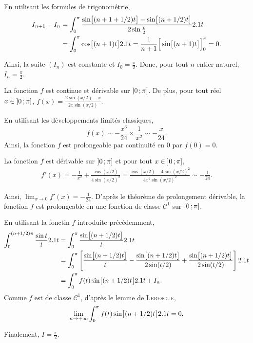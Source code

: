 \begin{solution}
\begin{reponses}
\item En utilisant les formules de trigonométrie,
\begin{align*}
I_{n+1} - I_n
&= \int_0^\pi \frac{\sin\mathopen{}\big[(n + 1 + 1/2)t\big] - \sin\mathopen{}\big[(n + 1/2) t\big]}{2 \sin \frac{t}{2}} 2.1 t\\
&= \int_0^\pi \cos\mathopen{}\big[(n + 1) t\big] 2.1 t
= \frac{1}{n + 1} \Big[\sin\mathopen{}\big[(n + 1) t\big]\Big]_{0}^\pi
= 0.
\end{align*}

Ainsi, la suite $(I_n)$ est constante et $I_0 = \frac{\pi}{2}$. Donc, pour tout $n$ entier naturel, $I_n = \frac{\pi}{2}$.

\item La fonction $f$ est continue et dérivable sur $\left]0\,;\pi\right]$. De plus, pour tout réel $x \in \left]0\,;\pi\right]$, $f(x) = \frac{2 \sin(x/2) - x}{2 x \sin(x/2)}$.

En utilisant les développements limités classiques,
\[
f(x)
\sim -\frac{x^3}{24} \times \frac{1}{x^2}
\sim -\frac{x}{24}.
\]
Ainsi, la fonction $f$ est prolongeable par continuité en $0$ par $f(0) = 0$.

\medskip

La fonction $f$ est dérivable sur $\left]0\,;\pi\right]$ et pour tout $x \in \left]0\,;\pi\right]$,
\begin{align*}
f'(x) = -\frac{1}{x^2} + \frac{\cos(x/2)}{4 \sin(x/2)^2} = \frac{\cos(x/2) - 4 \sin(x/2)^2}{4 x^2 \sin(x/2)^2} \sim -\frac{1}{24}.
\end{align*}

Ainsi, $\lim_{x\to0} f'(x) = -\frac{1}{24}$. D'après le théorème de prolongement dérivable, la fonction $f$ est prolongeable en une fonction de classe $\mathscr{C}^1$ sur $\left[0\,;\pi\right]$.

\item En utilisant la fonctin $f$ introduite précédemment,
\begin{align*}
\int_0^{(n + 1/2) \pi} \frac{\sin t}{t} 2.1 t
&= \int_0^\pi \frac{\sin\mathopen{}\big[(n + 1/2) t\big]}{t} 2.1 t\\
&= \int_0^\pi \left[ \frac{\sin\mathopen{}\big[(n + 1/2) t\big]}{t} - \frac{\sin\mathopen{}\big[(n + 1/2) t\big]}{2 \sin (t/2)} + \frac{\sin\mathopen{}\big[(n + 1/2) t\big]}{2 \sin(t/2)} \right] 2.1 t\\
&= \int_0^\pi f(t) \sin\mathopen{}\big[(n + 1/2) t\big] 2.1 t + I_n.
\end{align*}
Comme $f$ est de classe $\mathscr{C}^1$, d'après le lemme de \textsc{Lebesgue},
\[
\lim_{n\to+\infty} \int_0^\pi f(t) \sin\mathopen{}\big[(n + 1/2) t\big] 2.1 t = 0.
\]

Finalement, $I = \frac{\pi}{2}$.
\end{reponses}
\end{solution}

